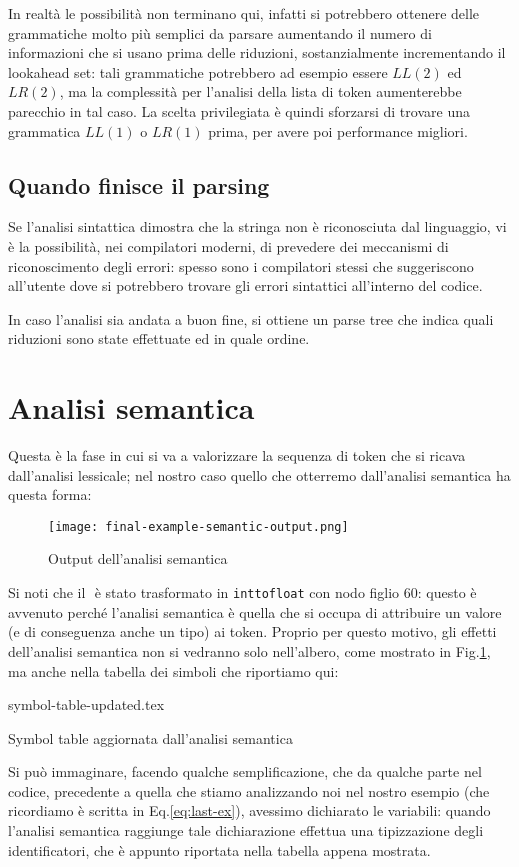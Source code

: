 \documentclass[class=book, crop=false, oneside, 12pt]{standalone}
\begin{document}
In realtà le possibilità non terminano qui, infatti si potrebbero ottenere delle grammatiche molto più semplici da parsare aumentando il numero di informazioni che si usano prima delle riduzioni, sostanzialmente incrementando il lookahead set: tali grammatiche potrebbero ad esempio essere \(LL(2)\) ed \(LR(2)\), ma la complessità per l'analisi della lista di token aumenterebbe parecchio in tal caso. La scelta privilegiata è quindi sforzarsi di trovare una grammatica \(LL(1)\) o \(LR(1)\) prima, per avere poi performance migliori.

\subsection{Quando finisce il parsing}
Se l'analisi sintattica dimostra che la stringa non è riconosciuta dal linguaggio, vi è la possibilità, nei compilatori moderni, di prevedere dei meccanismi di riconoscimento degli errori: spesso sono i compilatori stessi che suggeriscono all'utente dove si potrebbero trovare gli errori sintattici all'interno del codice.

In caso l'analisi sia andata a buon fine, si ottiene un parse tree che indica quali riduzioni sono state effettuate ed in quale ordine.

\section{Analisi semantica}
Questa è la fase in cui si va a valorizzare la sequenza di token che si ricava dall'analisi lessicale; nel nostro caso quello che otterremo dall'analisi semantica ha questa forma:
\begin{figure}[H]
    \centering
    \texttt{[image: final-example-semantic-output.png]}
    \caption{Output dell'analisi semantica}
    \label{fig:last-ex-semantic-output}
\end{figure}
Si noti che il \(<num, 60>\) è stato trasformato in \texttt{inttofloat} con nodo figlio \(60\): questo è avvenuto perché l'analisi semantica è quella che si occupa di attribuire un valore (e di conseguenza anche un tipo) ai token. Proprio per questo motivo, gli effetti dell'analisi semantica non si vedranno solo nell'albero, come mostrato in Fig.\ref{fig:last-ex-semantic-output}, ma anche nella tabella dei simboli che riportiamo qui:
\begin{table}[H]
	\centering
	{symbol-table-updated.tex}
    \caption{Symbol table aggiornata dall'analisi semantica}
    \label{tab:last-ex-symbol-table-updated}
\end{table}
Si può immaginare, facendo qualche semplificazione, che da qualche parte nel codice, precedente a quella che stiamo analizzando noi nel nostro esempio (che ricordiamo è scritta in Eq.\ref{eq:last-ex}), avessimo dichiarato le variabili: quando l'analisi semantica raggiunge tale dichiarazione effettua una tipizzazione degli identificatori, che è appunto riportata nella tabella appena mostrata.
\end{document}
